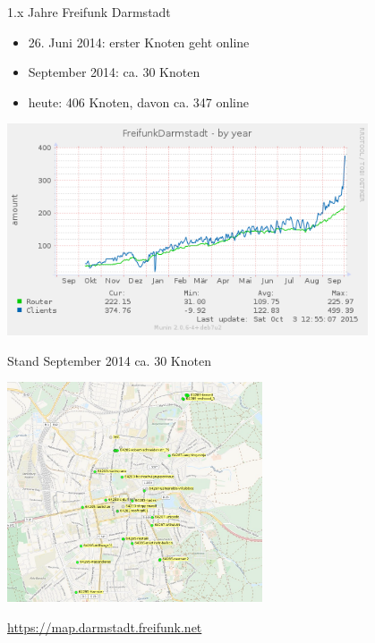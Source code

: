 \documentclass[10pt]{beamer}
\begin{document}
    \begin{frame}{1.x Jahre Freifunk Darmstadt}
      \vfill
      \begin{itemize}
        \item 26. Juni 2014: erster Knoten geht online
        \pause \item September 2014: ca. 30 Knoten
        \pause \item heute: 406 Knoten, davon ca. 347 online

      \end{itemize}
      \pause
      \begin{center}
        \includegraphics[width=0.8\textwidth]{images/ffda-Okt14-15}
      \end{center}
    \end{frame}

    \begin{frame}{Stand September 2014}
      ca. 30 Knoten
      \begin{center}
        \vfill
        \begin{center}
          \includegraphics[height=6.5cm]{images/darmstadt-map}
        \end{center}
        \vfill
        \url{https://map.darmstadt.freifunk.net}
      \end{center}
    \end{frame}
\end{document}

